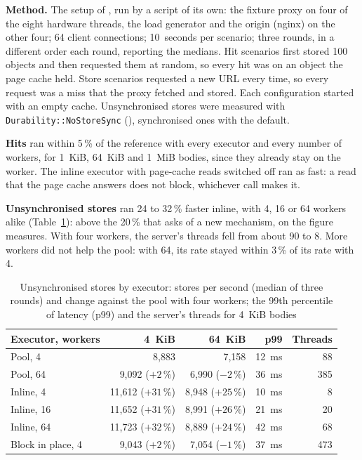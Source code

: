 \textbf{Method.} The setup of , run by a
script of its own: the fixture proxy on four of the eight hardware threads,
the load generator and the origin (nginx) on the other four; 64 client
connections; 10~seconds per scenario; three rounds, in a different order
each round, reporting the medians. Hit scenarios first stored 100 objects
and then requested them at random, so every hit was on an object the page
cache held. Store scenarios requested a new URL every time, so every request
was a miss that the proxy fetched and stored. Each configuration started
with an empty cache. Unsynchronised stores were measured with
\texttt{Durability::NoStoreSync} (),
synchronised ones with the default.

\textbf{Hits} ran within 5\,\% of the reference with every executor and
every number of workers, for 1~KiB, 64~KiB and 1~MiB bodies, since they
already stay on the worker. The inline executor with page-cache reads
switched off ran as fast: a read that the page cache answers does not
block, whichever call makes it.

\textbf{Unsynchronised stores} ran 24 to 32\,\% faster inline, with 4, 16
or 64 workers alike (Table~\ref{tab:executor-unsynced}): above the 20\,\%
that  asks of a new mechanism, on the figure
 measures. With four workers, the
server's threads fell from about 90 to 8. More workers did not help the
pool: with 64, its rate stayed within 3\,\% of its rate with 4.

\begin{table}[tb]
\centering\small\renewcommand{\arraystretch}{1.3}%
\caption{Unsynchronised stores by executor: stores per second (median of
three rounds) and change against the pool with four workers; the 99th
percentile of latency (p99) and the server's threads for 4~KiB bodies}%
\label{tab:executor-unsynced}
\begin{tabular}{|l|r|r|r|r|}
\hline
\textbf{Executor, workers} & \textbf{4~KiB} & \textbf{64~KiB} &
\textbf{p99} & \textbf{Threads} \\
\hline
Pool, 4 & 8,883 & 7,158 & 12~ms & 88 \\
\hline
Pool, 64 & 9,092 ($+2$\,\%) & 6,990 ($-2$\,\%) & 36~ms & 385 \\
\hline
Inline, 4 & 11,612 ($+31$\,\%) & 8,948 ($+25$\,\%) & 10~ms & 8 \\
\hline
Inline, 16 & 11,652 ($+31$\,\%) & 8,991 ($+26$\,\%) & 21~ms & 20 \\
\hline
Inline, 64 & 11,723 ($+32$\,\%) & 8,889 ($+24$\,\%) & 42~ms & 68 \\
\hline
Block in place, 4 & 9,043 ($+2$\,\%) & 7,054 ($-1$\,\%) & 37~ms & 473 \\
\hline
\end{tabular}
\end{table}

